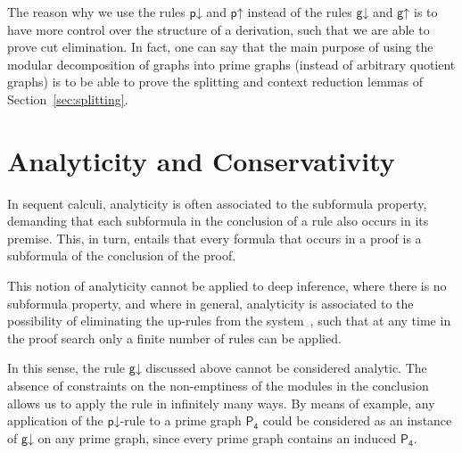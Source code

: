 \documentclass{lmcs} %
\def\pdr{\dprule}
\def\pur{\uprule}
\def\gdr{\dgrule}
\def\gur{\ugrule}
\def\grule{\mathsf{g}}
\def\dgrule{\grule\mathord{\downarrow}}
\def\ugrule{\grule\mathord{\uparrow}}
\def\prule{\mathsf{p}}
\def\dprule{\prule\mathord{\downarrow}}
\def\uprule{\prule\mathord{\uparrow}}
\theoremstyle{plain}
\def\pfour{\mathsf{P_4}}
\begin{document}
The reason why we use the rules $\pdr$ and $\pur$ instead of the rules $\gdr$ and
$\gur$ is to have more control over the structure of a derivation, such
that we are able to prove cut elimination. In fact, one can say that
the main purpose of using the modular decomposition of graphs into prime
graphs (instead of arbitrary quotient graphs) is to be able to prove
the splitting and context reduction lemmas of Section~\ref{sec:splitting}.





\section{Analyticity and Conservativity}\label{sec:MLL}


In sequent calculi, analyticity is often associated to the subformula
property, demanding that each subformula in the conclusion of a rule
also occurs in its premise. This, in turn, entails that every formula
that occurs in a proof is a subformula of the conclusion of the proof.

This notion of analyticity cannot be applied to deep inference, where
there is no subformula property, and where in general, analyticity is
associated to the possibility of eliminating the up-rules from the
system~\cite{Bruscoli2016}, such that at any time in the proof search
only a finite number of rules can be applied.
	
In this sense, the rule $\gdr$ discussed above cannot be considered
analytic. The absence of constraints on the non-emptiness of the
modules in the conclusion allows us to apply the rule in infinitely many
ways.  By means of example, any application of the $\pdr$-rule to a prime
graph $\pfour$ could be considered as an instance of
$\gdr$ on any prime graph, since every prime graph contains an
induced $\pfour$. 
\end{document}
